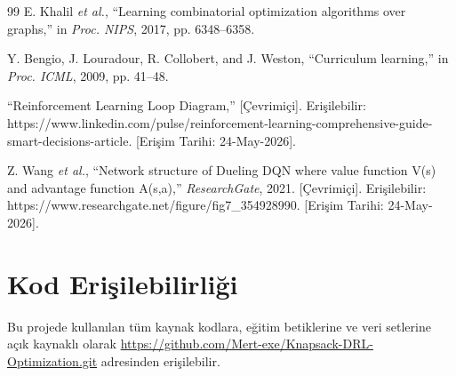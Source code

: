 \documentclass[conference]{IEEEtran}
\begin{document}
\begin{thebibliography}{99}
 E. Khalil \textit{et al.}, ``Learning combinatorial optimization algorithms over graphs,'' in \textit{Proc. NIPS}, 2017, pp. 6348--6358.

 Y. Bengio, J. Louradour, R. Collobert, and J. Weston, ``Curriculum learning,'' in \textit{Proc. ICML}, 2009, pp. 41--48.

``Reinforcement Learning Loop Diagram,'' [Çevrimiçi]. Erişilebilir: https://www.linkedin.com/pulse/reinforcement-learning-comprehensive-guide-smart-decisions-article. [Erişim Tarihi: 24-May-2026].

Z. Wang \textit{et al.}, ``Network structure of Dueling DQN where value function V(s) and advantage function A(s,a),'' \textit{ResearchGate}, 2021. [Çevrimiçi]. Erişilebilir: https://www.researchgate.net/figure/fig7_354928990. [Erişim Tarihi: 24-May-2026].

\end{thebibliography}

\section*{Kod Erişilebilirliği}
Bu projede kullanılan tüm kaynak kodlara, eğitim betiklerine ve veri setlerine açık kaynaklı olarak \url{https://github.com/Mert-exe/Knapsack-DRL-Optimization.git} adresinden erişilebilir.
\end{document}
